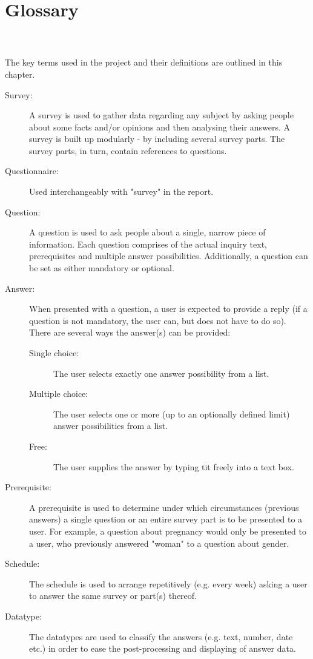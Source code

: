 \chapter{Glossary}
\label{chap:glossary}
\piotr \\\\
The key terms used in the project and their definitions are outlined in this chapter.

\begin{description}
\item[Survey:] A survey is used to gather data regarding any subject by asking people about some facts and/or opinions and then analysing their answers. A survey is built up modularly - by including several survey parts. The survey parts, in turn, contain references to questions. 
\item[Questionnaire:] Used interchangeably with "survey" in the report.
\item[Question:] A question is used to ask people about a single, narrow piece of information. Each question comprises of the actual inquiry text, prerequisites and multiple answer possibilities. Additionally, a question can be set as either mandatory or optional.
\item[Answer:] When presented with a question, a user is expected to provide a reply (if a question is not mandatory, the user can, but does not have to do so). There are several ways the answer(s) can be provided:
  \begin{description}
    \item[Single choice:] The user selects exactly one answer possibility from a list.
    \item[Multiple choice:] The user selects one or more (up to an optionally defined limit) answer possibilities from a list.
    \item[Free:] The user supplies the answer by typing tit freely into a text box.
  \end{description}
\item[Prerequisite:] A prerequisite is used to determine under which circumstances (previous answers) a single question or an entire survey part is to be presented to a user. For example, a question about pregnancy would only be presented to a user, who previously answered "woman" to a question about gender.
\item[Schedule:] The schedule is used to arrange repetitively (e.g. every week) asking a user to answer the same survey or part(s) thereof.
\item[Datatype:] The datatypes are used to classify the answers (e.g. text, number, date etc.) in order to ease the post-processing and displaying of answer data.
\end{description}